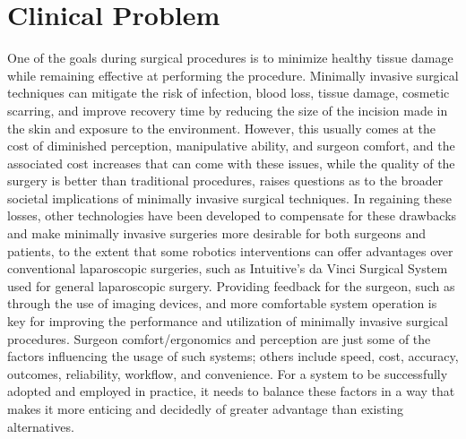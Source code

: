 \documentclass[12pt]{report}
\begin{document}
\section{Clinical Problem}
\label{sec:clinicalProblem}
One of the goals during surgical procedures is to minimize healthy tissue damage while remaining effective at performing the procedure. Minimally invasive surgical techniques can mitigate the risk of infection, blood loss, tissue damage, cosmetic scarring, and improve recovery time by reducing the size of the incision made in the skin and exposure to the environment. \cite{minimallyInvasiveSurgeryBenefits} However, this usually comes at the cost of diminished perception, manipulative ability, and surgeon comfort, and the associated cost increases that can come with these issues, while the quality of the surgery is better than traditional procedures, raises questions as to the broader societal implications of minimally invasive surgical techniques. \cite{broadPerspectivesMinimallyInvasiveSurgery} In regaining these losses, other technologies have been developed to compensate for these drawbacks and make minimally invasive surgeries more desirable for both surgeons and patients, to the extent that some robotics interventions can offer advantages over conventional laparoscopic surgeries, such as Intuitive's da Vinci Surgical System used for general laparoscopic surgery. \cite{daVinciEfficacy} Providing feedback for the surgeon, such as through the use of imaging devices, and more comfortable system operation is key for improving the performance and utilization of minimally invasive surgical procedures. Surgeon comfort/ergonomics and perception are just some of the factors influencing the usage of such systems; others include speed, cost, accuracy, outcomes, reliability, workflow, and convenience. For a system to be successfully adopted and employed in practice, it needs to balance these factors in a way that makes it more enticing and decidedly of greater advantage than existing alternatives.
\end{document}
